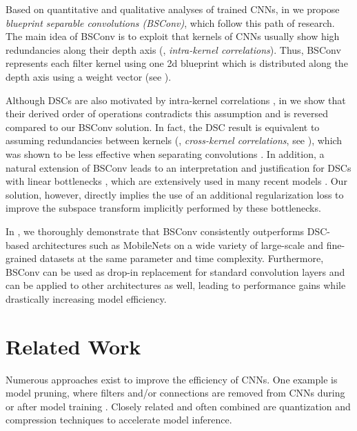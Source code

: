 \documentclass[10pt,twocolumn,letterpaper]{article}
\newcommand{\DCCK}{BSConv\xspace}
\begin{document}
Based on quantitative and qualitative analyses of trained CNNs, in  we propose \textit{blueprint separable convolutions (\DCCK)}, which follow this path of research.
The main idea of \DCCK is to exploit that kernels of CNNs usually show high redundancies along their depth axis (\ie, \textit{intra-kernel correlations}).
Thus, \DCCK represents each filter kernel using one 2d blueprint which is distributed along the depth axis using a weight vector (see ).

Although DSCs are also motivated by intra-kernel correlations \cite{sifre2014rigid}, in  we show that their derived order of operations contradicts this assumption and is reversed compared to our \DCCK solution.
In fact, the DSC result is equivalent to assuming redundancies between kernels (\ie, \textit{cross-kernel correlations}, see ), which was shown to be less effective when separating convolutions \cite{guo2018network}.
In addition, a natural extension of \DCCK leads to an interpretation and justification for DSCs with linear bottlenecks \cite{sandler2018mobilenetv2}, which are extensively used in many recent models \cite{howard2019searching,tan2019mnasnet,tan2019efficientnet}.
Our solution, however, directly implies the use of an additional regularization loss to improve the subspace transform implicitly performed by these bottlenecks.

In , we thoroughly demonstrate that \DCCK consistently outperforms DSC-based architectures such as MobileNets on a wide variety of large-scale and fine-grained datasets at the same parameter and time complexity.
Furthermore, \DCCK can be used as drop-in replacement for standard convolution layers and can be applied to other architectures as well, leading to performance gains while drastically increasing model efficiency.



\section{Related Work}
Numerous approaches exist to improve the efficiency of CNNs.
One example is model pruning, where filters and/or connections are removed from CNNs during or after model training \cite{han2015learning,li2016pruning,hassibi1993second,liu2018rethinking}.
Closely related and often combined are quantization \cite{rastegari2016xnor,zhou2017incremental,hubara2017quantized} and compression techniques \cite{gong2014compressing,han2015deep,han2016eie} to accelerate model inference.
\end{document}
